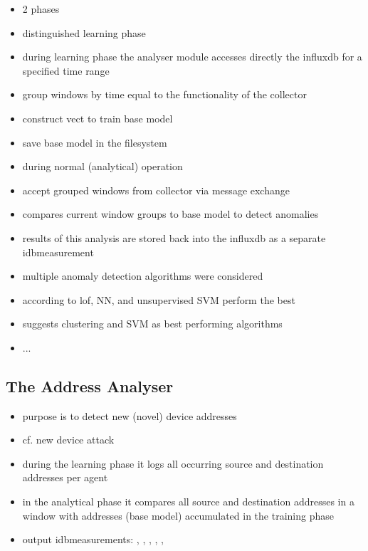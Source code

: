 \begin{itemize}
	\item 2 phases
	\item distinguished learning phase
	\item during learning phase the analyser module accesses directly the \gls{influxdb} for a specified time range
	\item group windows by time equal to the functionality of the collector
	\item construct \gls{vect} to train base model
	\item save base model in the filesystem
	
	\item during normal (analytical) operation
	\item accept grouped windows from collector via message exchange
	\item compares current window groups to base model to detect anomalies
	\item results of this analysis are stored back into the \gls{influxdb} as a separate \gls{idbmeasurement}
	
	\item multiple anomaly detection algorithms were considered
	\item according to \textcite{Lazarevic2003} \gls{lof}, NN, and unsupervised SVM perform the best
	\item \textcite{Eskin2002} suggests clustering and SVM as best performing algorithms
	\item ...
\end{itemize}

\subsection{The Address Analyser}
\label{sec:concept:anal:addr}

\begin{itemize}
	\item purpose is to detect new (novel) device addresses
	\item cf. new device attack
	\item during the learning phase it logs all occurring source and destination addresses per agent
	\item in the analytical phase it compares all source and destination addresses in a window with addresses (base model) accumulated in the training phase
	\item output \glspl{idbmeasurement}: , , , , , 
\end{itemize}


